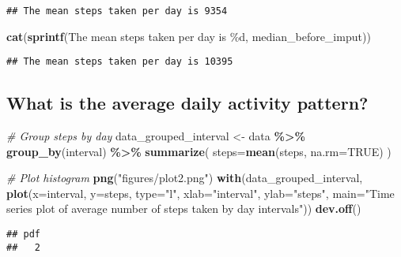 \documentclass[
]{article}
\newenvironment{Shaded}{\begin{snugshade}}{\end{snugshade}}
\newcommand{\AttributeTok}[1]{\textcolor[rgb]{0.13,0.29,0.53}{#1}}
\newcommand{\CommentTok}[1]{\textcolor[rgb]{0.56,0.35,0.01}{\textit{#1}}}
\newcommand{\ConstantTok}[1]{\textcolor[rgb]{0.56,0.35,0.01}{#1}}
\newcommand{\FunctionTok}[1]{\textcolor[rgb]{0.13,0.29,0.53}{\textbf{#1}}}
\newcommand{\NormalTok}[1]{#1}
\newcommand{\OtherTok}[1]{\textcolor[rgb]{0.56,0.35,0.01}{#1}}
\newcommand{\SpecialCharTok}[1]{\textcolor[rgb]{0.81,0.36,0.00}{\textbf{#1}}}
\newcommand{\StringTok}[1]{\textcolor[rgb]{0.31,0.60,0.02}{#1}}
\begin{document}
\begin{verbatim}
## The mean steps taken per day is 9354
\end{verbatim}

\begin{Shaded}
\begin{Highlighting}[]
\FunctionTok{cat}\NormalTok{(}\FunctionTok{sprintf}\NormalTok{(}\StringTok{\textquotesingle{}The mean steps taken per day is \%d\textquotesingle{}}\NormalTok{, median\_before\_imput))}
\end{Highlighting}
\end{Shaded}

\begin{verbatim}
## The mean steps taken per day is 10395
\end{verbatim}

\hypertarget{what-is-the-average-daily-activity-pattern}{%
\subsection{What is the average daily activity
pattern?}\label{what-is-the-average-daily-activity-pattern}}

\begin{Shaded}
\begin{Highlighting}[]
\CommentTok{\# Group steps by day}
\NormalTok{data\_grouped\_interval }\OtherTok{\textless{}{-}}\NormalTok{ data }\SpecialCharTok{\%\textgreater{}\%} 
  \FunctionTok{group\_by}\NormalTok{(interval) }\SpecialCharTok{\%\textgreater{}\%} 
  \FunctionTok{summarize}\NormalTok{(}
    \AttributeTok{steps=}\FunctionTok{mean}\NormalTok{(steps, }\AttributeTok{na.rm=}\ConstantTok{TRUE}\NormalTok{)}
\NormalTok{  )}

\CommentTok{\# Plot histogram}
\FunctionTok{png}\NormalTok{(}\StringTok{"figures/plot2.png"}\NormalTok{)}
\FunctionTok{with}\NormalTok{(data\_grouped\_interval, }\FunctionTok{plot}\NormalTok{(}\AttributeTok{x=}\NormalTok{interval, }\AttributeTok{y=}\NormalTok{steps, }\AttributeTok{type=}\StringTok{"l"}\NormalTok{, }\AttributeTok{xlab=}\StringTok{"interval"}\NormalTok{, }\AttributeTok{ylab=}\StringTok{"steps"}\NormalTok{, }\AttributeTok{main=}\StringTok{"Time series plot of average number of steps taken by day intervals"}\NormalTok{))}
\FunctionTok{dev.off}\NormalTok{()}
\end{Highlighting}
\end{Shaded}

\begin{verbatim}
## pdf 
##   2
\end{verbatim}
\end{document}
